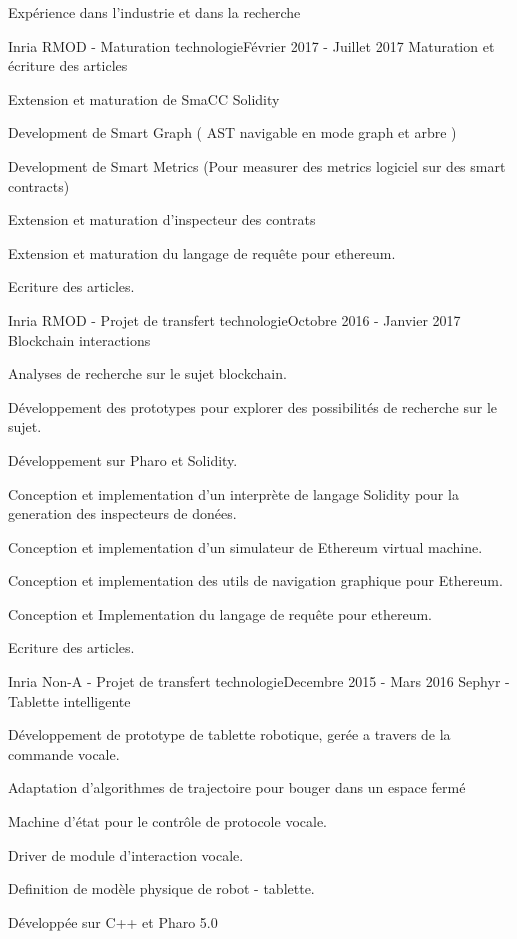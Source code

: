 \documentclass{resume} %
\begin{document}
\begin{rSection}{Exp\'{e}rience dans l'industrie et dans la recherche}
	\begin{rSubsection}{Inria RMOD - Maturation technologie}{F\'{e}vrier 2017 - Juillet 2017 }{Maturation et écriture des articles}
		\item 
		\item Extension et maturation de SmaCC Solidity
		\item Development de Smart Graph ( AST navigable en mode graph et arbre ) 
		\item Development de Smart Metrics (Pour measurer des metrics logiciel sur des smart contracts) 
		\item Extension et maturation d'inspecteur des contrats 
		\item Extension et maturation du langage de requ\^{e}te pour ethereum. 
		\item Ecriture des articles. 
	\end{rSubsection}

	\begin{rSubsection}{Inria RMOD - Projet de transfert technologie}{Octobre 2016 - Janvier 2017 }{Blockchain interactions}
		\item 
		\item Analyses de recherche sur le sujet blockchain. 
		\item D\'{e}veloppement des prototypes pour explorer des possibilit\'{e}s de recherche sur le sujet.
		\item D\'{e}veloppement sur Pharo et Solidity. 
		\item Conception et implementation d'un interpr\`{e}te de langage Solidity pour la generation des inspecteurs de don\'{e}es.
		\item Conception et implementation d'un simulateur de Ethereum virtual machine. 
		\item Conception et implementation des utils de navigation graphique pour Ethereum. 
		\item Conception et Implementation du langage de requ\^{e}te pour ethereum. 
		\item Ecriture des articles.
	\end{rSubsection}
	
	\begin{rSubsection}{Inria Non-A - Projet de transfert technologie}{Decembre 2015 - Mars 2016 }{Sephyr - Tablette intelligente }
		\item 
		\item D\'{e}veloppement de prototype de tablette robotique, ger\'{e}e a travers de la commande vocale. 
		\item Adaptation d'algorithmes de trajectoire pour bouger dans un espace ferm\'{e}
		\item Machine d'\'{e}tat pour le contr\^ole de protocole vocale. 
		\item Driver de module d'interaction vocale.  
		\item Definition de mod\`ele physique de robot - tablette. 
		\item D\'{e}velopp\'{e}e sur C++ et Pharo 5.0
	\end{rSubsection}
	

\end{rSection}
\end{document}
